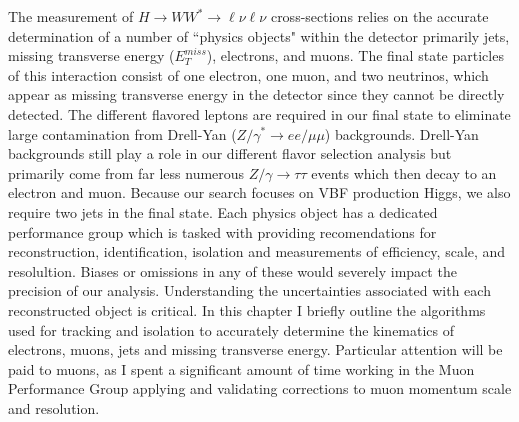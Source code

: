 The measurement of $H\rightarrow WW^*\rightarrow \ell\nu\ell\nu$ cross-sections relies on the accurate determination of a number of ``physics objects" within the detector primarily jets, missing transverse energy ($E_T^{miss}$), electrons, and muons. The final state particles of this interaction consist of one electron, one muon, and two neutrinos, which appear as missing transverse energy in the detector since they cannot be directly detected. The different flavored leptons are required in our final state to eliminate large contamination from Drell-Yan ($Z/\gamma^*\rightarrow ee/\mu\mu$) backgrounds. Drell-Yan backgrounds still play a role in our different flavor selection analysis but primarily come from far less numerous $Z/\gamma\rightarrow\tau\tau$ events which then decay to an electron and muon. Because our search focuses on VBF production Higgs, we also require two jets in the final state. Each physics object has a dedicated performance group which is tasked with providing recomendations for reconstruction, identification, isolation and measurements of efficiency, scale, and resolultion. Biases or omissions in any of these would severely impact the precision of our analysis. Understanding the uncertainties associated with each reconstructed object is critical. In this chapter I briefly outline the algorithms used for tracking and isolation to accurately determine the kinematics of electrons, muons, jets and missing transverse energy. Particular attention will be paid to muons, as I spent a significant amount of time working in the Muon Performance Group applying and validating corrections to muon momentum scale and resolution. 

